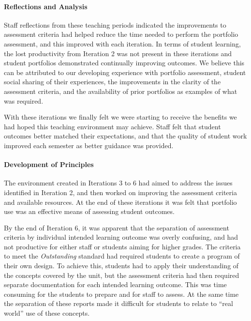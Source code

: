 

\paragraph{Reflections and Analysis} %

Staff reflections from these teaching periods indicated the improvements to assessment criteria had helped reduce the time needed to perform the portfolio assessment, and this improved with each iteration. In terms of student learning, the lost productivity from Iteration 2 was not present in these iterations and student portfolios demonstrated continually improving outcomes. We believe this can be attributed to our developing experience with portfolio assessment, student social sharing of their experiences, the improvements in the clarity of the assessment criteria, and the availability of prior portfolios as examples of what was required.

With these iterations we finally felt we were starting to receive the benefits we had hoped this teaching environment may achieve. Staff felt that student outcomes better matched their expectations, and that the quality of student work improved each semester as better guidance was provided.

\paragraph{Development of Principles} %

The environment created in Iterations 3 to 6 had aimed to address the issues identified in Iteration 2, and then worked on improving the assessment criteria and available resources. At the end of these iterations it was felt that portfolio use was an effective means of assessing student outcomes.

By the end of Iteration 6, it was apparent that the separation of assessment criteria by individual intended learning outcome was overly confusing, and had not productive for either staff or students aiming for higher grades. The criteria to meet the \emph{Outstanding} standard had required students to create a program of their own design. To achieve this, students had to apply their understanding of the concepts covered by the unit, but the assessment criteria had then required separate documentation for each intended learning outcome. This was time consuming for the students to prepare and for staff to assess. At the same time the separation of these reports made it difficult for students to relate to ``real world'' use of these concepts.

